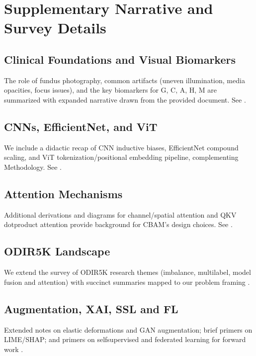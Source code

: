 \appendix
\chapter{Supplementary Narrative and Survey Details}

\section{Clinical Foundations and Visual Biomarkers}
The role of fundus photography, common artifacts (uneven illumination, media opacities, focus issues), and the key biomarkers for G, C, A, H, M are summarized with expanded narrative drawn from the provided document. See \cite{docxRef01,docxRef07,docxRef08,docxRef09,docxRef12,docxRef13,docxRef14,docxRef16,docxRef17}.

\section{CNNs, EfficientNet, and ViT}
We include a didactic recap of CNN inductive biases, EfficientNet compound scaling, and ViT tokenization/positional embedding pipeline, complementing Methodology. See \cite{docxRef19,docxRef20,docxRef21,docxRef22,docxRef25,docxRef27}.

\section{Attention Mechanisms}
Additional derivations and diagrams for channel/spatial attention and Q\textendash K\textendash V dot\textendash product attention provide background for CBAM’s design choices. See \cite{docxRef29,docxRef31,docxRef32,docxRef33}.

\section{ODIR\textendash 5K Landscape}
We extend the survey of ODIR\textendash 5K research themes (imbalance, multi\textendash label, model fusion and attention) with succinct summaries mapped to our problem framing \cite{docxRef41,docxRef42,docxRef43}.

\section{Augmentation, XAI, SSL and FL}
Extended notes on elastic deformations and GAN augmentation; brief primers on LIME/SHAP; and primers on self\textendash supervised and federated learning for forward work \cite{docxRef46,docxRef47,docxRef48,docxRef49,docxRef50,docxRef52,docxRef53,docxRef54,docxRef55,docxRef56,docxRef42,docxRef44,docxRef45,docxRef66,docxRef67,docxRef68}.



